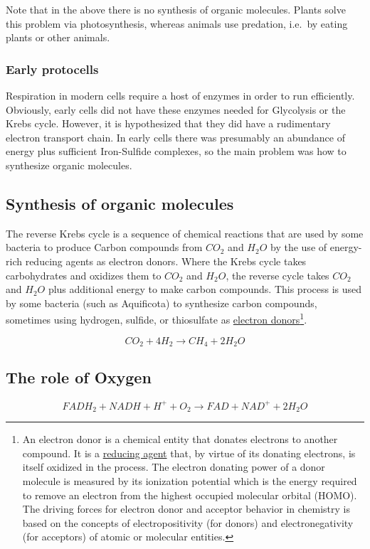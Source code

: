 \documentclass[a4paper,14pt]{extarticle}
\begin{document}
Note that in the above there is no synthesis of organic molecules.  Plants solve this
problem via photosynthesis, whereas animals use predation, i.e.\ by eating plants or
other animals.

\subsubsection{Early protocells}
Respiration in modern cells require a host of enzymes in order to run efficiently.
Obviously, early cells did not have these enzymes needed for Glycolysis or the Krebs
cycle.  However, it is hypothesized that they did have a rudimentary electron transport
chain.  In early cells there was presumably an abundance of energy plus sufficient
Iron-Sulfide complexes, so the main problem was how to synthesize organic molecules.

\subsection{Synthesis of organic molecules}
The reverse Krebs cycle is a sequence of chemical reactions that are used by some bacteria
to produce Carbon compounds from $CO_2$ and $H_2O$ by the use of energy-rich reducing
agents as electron donors.  Where the Krebs cycle takes carbohydrates and oxidizes them to
$CO_2$ and $H_2O$, the reverse cycle takes $CO_2$ and $H_2O$ plus additional energy to
make carbon compounds. This process is used by some bacteria (such as Aquificota) to
synthesize carbon compounds, sometimes using hydrogen, sulfide, or thiosulfate as
\href{https://en.wikipedia.org/wiki/Electron_donor}{electron donors}\footnote{An electron
donor is a chemical entity that donates electrons to another compound. It is a
\href{https://en.wikipedia.org/wiki/Reducing_agent}{reducing agent} that, by virtue of its
donating electrons, is itself oxidized in the process. The electron donating power of a
donor molecule is measured by its ionization potential which is the energy required to
remove an electron from the highest occupied molecular orbital (HOMO). The driving forces
for electron donor and acceptor behavior in chemistry is based on the concepts of
electropositivity (for donors) and electronegativity (for acceptors) of atomic or
molecular entities.}.

\[
    CO_2 + 4H_2 \rightarrow CH_4 + 2H_2O
\]

\subsection{The role of Oxygen}
\[
    FADH_2 + NADH + H^+ + O_2 \rightarrow FAD + NAD^+ + 2H_2O
\]
\end{document}
